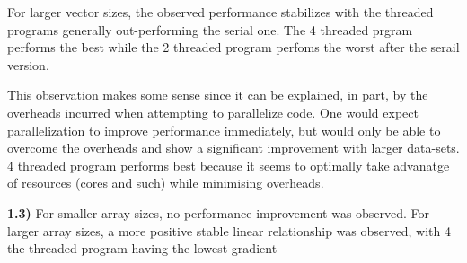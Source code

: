 \documentclass[12pt]{article}
\begin{document}
	For larger vector sizes, the observed performance stabilizes with the threaded programs generally out-performing the serial one. The 4 threaded prgram performs the best while the 2 threaded program perfoms the worst after the serail version. \newline
	
	This observation makes some sense since it can be explained, in part, by the overheads incurred when attempting to parallelize code. One would expect parallelization to improve performance immediately, but would only be able to overcome the overheads and show a significant improvement with larger data-sets. 4 threaded program performs best because it seems to optimally take advanatge of resources (cores and such) while minimising overheads. \newline
	
	\textbf{1.3)} For smaller array sizes, no performance improvement was observed. For larger array sizes, a more positive stable linear relationship was observed, with 4 the threaded program having the lowest gradient
	
\end{document}
